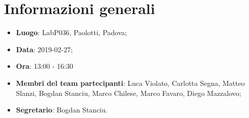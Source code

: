 \section{Informazioni generali}
\begin{itemize}
	\item \textbf{Luogo}: LabP036, Paolotti, Padova; 
	\item \textbf{Data}: 2019-02-27;
	\item \textbf{Ora}: 13:00 - 16:30
	\item \textbf{Membri del team partecipanti}: Luca Violato, Carlotta Segna, Matteo Slanzi, Bogdan Stanciu, Marco Chilese, Marco Favaro, Diego Mazzalovo; 
	\item \textbf{Segretario}: Bogdan Stanciu. 
\end{itemize}


